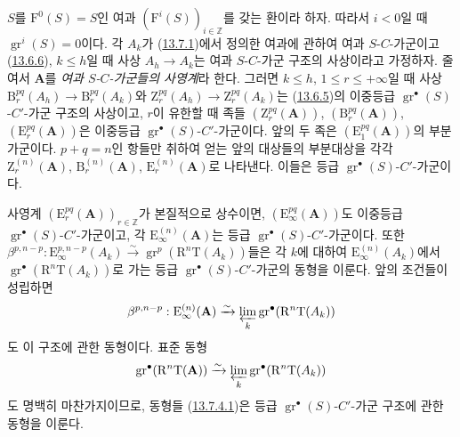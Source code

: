 \begin{env}[13.7.6]
\label{0.13.7.6-fr}
$S$를 $\mathrm F^0(S)=S$인 여과 $(\mathrm F^i(S))_{i\in\mathbb Z}$를
갖는 환이라 하자. 따라서 $i<0$일 때
$\operatorname{gr}^i(S)=0$이다. 각 $A_k$가
(\hyperref[0.13.7.1-fr]{13.7.1})에서 정의한 여과에 관하여 여과
$S$-$C$-가군이고 (\hyperref[0.13.6.6-fr]{13.6.6}), $k\leq h$일 때
사상 $A_h\to A_k$는 여과 $S$-$C$-가군 구조의 사상이라고 가정하자.
줄여서 $\mathbf A$를 \emph{여과 $S$-$C$-가군들의 사영계}라 한다.
그러면 $k\leq h$, $1\leq r\leq+\infty$일 때 사상
$\mathrm B_r^{pq}(A_h)\to\mathrm B_r^{pq}(A_k)$와
$\mathrm Z_r^{pq}(A_h)\to\mathrm Z_r^{pq}(A_k)$는
(\hyperref[0.13.6.5-fr]{13.6.5})의 이중등급
$\operatorname{gr}^\bullet(S)$-$C'$-가군 구조의 사상이고, $r$이
유한할 때 족들 $(\mathrm Z_r^{pq}(\mathbf A))$,
$(\mathrm B_r^{pq}(\mathbf A))$, $(\mathrm E_r^{pq}(\mathbf A))$은
이중등급 $\operatorname{gr}^\bullet(S)$-$C'$-가군이다. 앞의 두 족은
$(\mathrm E_1^{pq}(\mathbf A))$의 부분가군이다. $p+q=n$인 항들만
취하여 얻는 앞의 대상들의 부분대상을 각각
$\mathrm Z_r^{(n)}(\mathbf A)$, $\mathrm B_r^{(n)}(\mathbf A)$,
$\mathrm E_r^{(n)}(\mathbf A)$로 나타낸다. 이들은 등급
$\operatorname{gr}^\bullet(S)$-$C'$-가군이다.

사영계 $(\mathrm E_r^{pq}(\mathbf A))_{r\in\mathbb Z}$가 본질적으로
상수이면, $(\mathrm E_\infty^{pq}(\mathbf A))$도 이중등급
$\operatorname{gr}^\bullet(S)$-$C'$-가군이고, 각
$\mathrm E_\infty^{(n)}(\mathbf A)$는 등급
$\operatorname{gr}^\bullet(S)$-$C'$-가군이다. 또한
$\beta^{p,n-p}:\mathrm E_\infty^{p,n-p}(A_k)\xrightarrow{\sim}
\operatorname{gr}^p(\mathrm R^n\mathrm T(A_k))$들은 각 $k$에 대하여
$\mathrm E_\infty^{(n)}(A_k)$에서
$\operatorname{gr}^\bullet(\mathrm R^n\mathrm T(A_k))$로 가는 등급
$\operatorname{gr}^\bullet(S)$-$C'$-가군의 동형을 이룬다. 앞의
조건들이 성립하면
\[
\beta^{p,n-p}:\mathrm E_\infty^{(n)}(\mathbf A)\xrightarrow{\sim}
\varprojlim_k\operatorname{gr}^\bullet(\mathrm R^n\mathrm T(A_k))
\]
도 이 구조에 관한 동형이다. 표준 동형
\[
\operatorname{gr}^\bullet(\mathrm R^n\mathrm T(\mathbf A))
\xrightarrow{\sim}
\varprojlim_k\operatorname{gr}^\bullet(\mathrm R^n\mathrm T(A_k))
\]
도 명백히 마찬가지이므로, 동형들
(\hyperref[0.13.7.4.1-fr]{13.7.4.1})은 등급
$\operatorname{gr}^\bullet(S)$-$C'$-가군 구조에 관한 동형을 이룬다.
\end{env}

